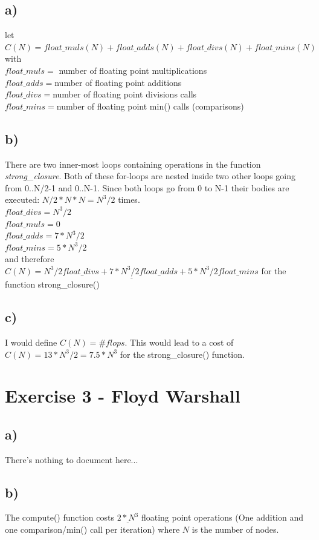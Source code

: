 \documentclass[10pt,a4paper,oneside,notitlepage]{report}
\begin{document}
\subsection*{a)}
let $C(N) = float\_muls(N) + float\_adds (N) + float\_divs(N) + float\_mins(N)$ \\ with \\
$float\_muls = $ number of floating point multiplications \\
$float\_adds = $number of floating point additions \\
$float\_divs = $number of floating point divisions calls \\
$float\_mins = $number of floating point min() calls (comparisons) \\

\subsection*{b)}
There are two inner-most loops containing operations in the function \textit{strong\_closure}. Both of these for-loops are nested inside two other loops going from 0..N/2-1 and 0..N-1. Since both loops go from 0 to N-1 their bodies are executed: $N/2 * N * N = N^3/2$ times.
\\
$float\_divs = N^3/2$ \\
$float\_muls = 0$ \\
$float\_adds = 7*N^3/2$ \\
$float\_mins = 5*N^3/2$\\
and therefore $\underline{C(N) = N^3/2 float\_divs + 7*N^3/2 float\_adds + 5*N^3/2 float\_mins}$ for the function strong\_closure()

\subsection*{c)}
I would define $C(N) = {\#flops}$. This would lead to a cost of $C(N) = 13*N^3/2 = 7.5*N^3$ for the strong\_closure() function.

\section*{Exercise 3 - Floyd Warshall}
\subsection*{a)}
There's nothing to document here...
\subsection*{b)}
The compute() function costs $\underline{2*N^3}$ floating point operations (One addition and one comparison/min() call per iteration) where $N$ is the number of nodes.
\end{document}
